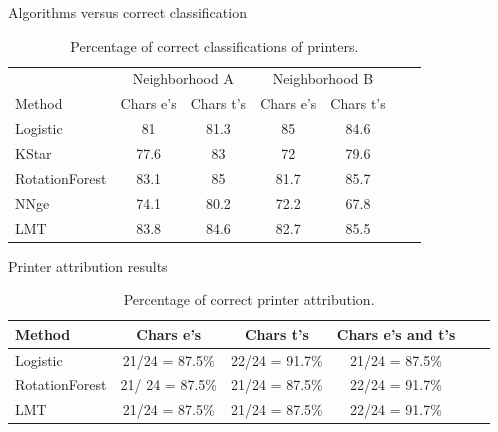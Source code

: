 \documentclass[notes]{beamer}
\begin{document}
\begin{frame}

\begin{block}{Algorithms versus correct classification}

\begin{table}
\label{tab:correct_classification}
\caption{Percentage of correct classifications of printers.}
\begin{center}
\begin{small} 
\setlength{\tabcolsep}{3pt} 
\begin{tabular}{l*{5}{c}r} & \multicolumn{2}{c}{Neighborhood A} & \multicolumn{2}{c}{Neighborhood B}\\ \cline{1-5}
Method & Chars e’s & Chars t’s & Chars e’s & Chars t’s \\
\hline
Logistic & 81 & 81.3 & 85 & 84.6\\
KStar & 77.6 & 83 & 72 & 79.6\\
RotationForest & 83.1 & 85 & 81.7 & 85.7\\
NNge & 74.1 & 80.2 & 72.2 & 67.8\\
LMT & 83.8 & 84.6 & 82.7 & 85.5\\

\end{tabular}
\end{small}
\end{center}
\end{table}

\end{block}

\end{frame}

\begin{frame}

\begin{block}{Printer attribution results}

\begin{table}
\caption{Percentage of correct printer attribution.}
\label{tab:correct_printer_attribution}
\begin{center}
\begin{small} 
\setlength{\tabcolsep}{3pt} 
\begin{tabular}{l*{4}{c}r} \cline{1-4}
Method & Chars e’s & Chars t’s & Chars e’s and t’s \\
\hline
Logistic & 21/24 = 87.5\% & 22/24 = 91.7\% & 21/24 = 87.5\% \\

RotationForest & 21/ 24 = 87.5\% & 21/24 = 87.5\% & 22/24 = 91.7\% \\

LMT & 21/24 = 87.5\% & 21/24 = 87.5\% & 22/24 = 91.7\% \\

\end{tabular}
\end{small}
\end{center}
\end{table}

\end{block}

\end{frame}
\end{document}
